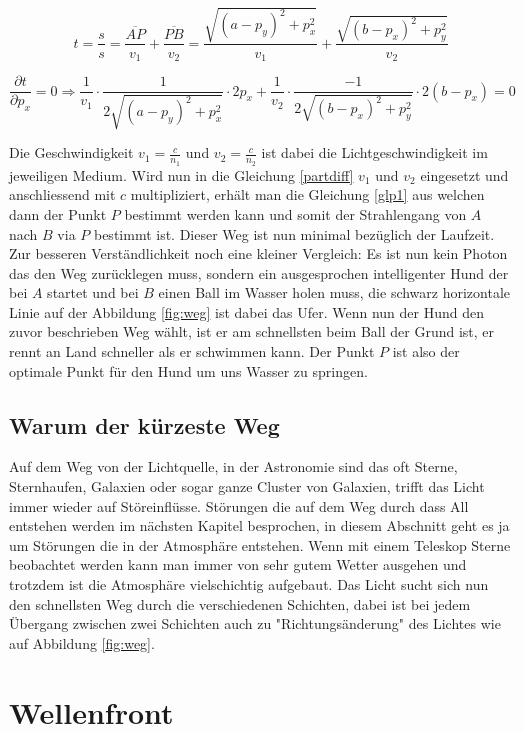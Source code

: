 \begin{refsection}
\begin{equation}\label{tbest}
t=\dfrac{s}{s}=\dfrac{\overline{AP}}{v_{1}}+\dfrac{\overline{PB}}{v_{2}}= 
\dfrac{\sqrt{(a-p_{y})^{2}+p_{x}^{2}}}{v_{1}}+ 
\dfrac{\sqrt{(b-p_{x})^{2}+p_{y}^{2}}}{v_{2}}
\end{equation}

\begin{equation}\label{partdiff}
\dfrac{\partial t}{\partial p_{x}}=0 \Rightarrow 
\dfrac{1}{v_{1}}\cdot \dfrac{1}{2 \sqrt{(a-p_{y})^{2}+p_{x}^{2}}}\cdot 2p_{x} +
\dfrac{1}{v_{2}}\cdot \dfrac{-1}{2 \sqrt{(b-p_{x})^{2}+p_{y}^{2}}}\cdot 2(b-p_{x})= 0
\end{equation}

Die Geschwindigkeit $ v_{1} = \frac{c}{n_{1}} $ und $ v_{2} = \frac{c}{n_{2}}$ ist dabei die Lichtgeschwindigkeit im jeweiligen Medium. Wird nun in die Gleichung \eqref{partdiff} $ v_{1}$ und $ v_{2}$ eingesetzt und anschliessend mit $c$ multipliziert, erhält man die Gleichung \eqref{glp1} aus welchen dann der Punkt $P$ bestimmt werden kann und somit der Strahlengang von $A$ nach $B$ via $P$ bestimmt ist. Dieser Weg ist nun minimal bezüglich der Laufzeit. Zur besseren Verständlichkeit noch eine kleiner Vergleich:\newline
Es ist nun kein Photon das den Weg zurücklegen muss, sondern ein ausgesprochen intelligenter Hund der bei $A$ startet und bei $B$ einen Ball im Wasser holen muss, die schwarz horizontale Linie auf der Abbildung \ref{fig:weg} ist dabei das Ufer. Wenn nun der Hund den zuvor beschrieben Weg wählt, ist er am schnellsten beim Ball der Grund ist, er rennt an Land schneller als er schwimmen kann. Der Punkt $P$ ist also der optimale Punkt für den Hund um uns Wasser zu springen.

\subsection{Warum der kürzeste Weg}
Auf dem Weg von der Lichtquelle, in der Astronomie sind das oft Sterne, Sternhaufen, Galaxien oder sogar ganze Cluster von Galaxien, trifft das Licht immer wieder auf Störeinflüsse. Störungen die auf dem Weg durch dass All entstehen werden im nächsten Kapitel besprochen, in diesem Abschnitt geht es ja um Störungen die in der Atmosphäre entstehen. Wenn mit einem Teleskop Sterne beobachtet werden kann man immer von sehr gutem Wetter ausgehen und trotzdem ist die Atmosphäre vielschichtig aufgebaut. Das Licht sucht sich nun den schnellsten Weg durch die verschiedenen Schichten, dabei ist bei jedem Übergang zwischen zwei Schichten auch zu "Richtungsänderung" des Lichtes wie auf Abbildung \ref{fig:weg}.

\section{Wellenfront}



\printbibliography[heading=subbibliography]
\end{refsection}

